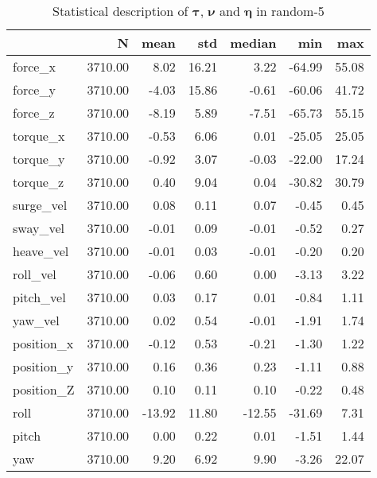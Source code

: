 \begin{table}[hb]
\centering
\caption{Statistical description of $\boldsymbol{\tau}$, $\boldsymbol{\nu}$ and $\boldsymbol{\eta}$ in random-5}
\label{tab:description-random-5}
\begin{tabular}{lrrrrrr}
\toprule
{} &       N &   mean &   std & median &    min &   max \\
\midrule
force\_x    & 3710.00 &   8.02 & 16.21 &   3.22 & -64.99 & 55.08 \\
force\_y    & 3710.00 &  -4.03 & 15.86 &  -0.61 & -60.06 & 41.72 \\
force\_z    & 3710.00 &  -8.19 &  5.89 &  -7.51 & -65.73 & 55.15 \\
torque\_x   & 3710.00 &  -0.53 &  6.06 &   0.01 & -25.05 & 25.05 \\
torque\_y   & 3710.00 &  -0.92 &  3.07 &  -0.03 & -22.00 & 17.24 \\
torque\_z   & 3710.00 &   0.40 &  9.04 &   0.04 & -30.82 & 30.79 \\
surge\_vel  & 3710.00 &   0.08 &  0.11 &   0.07 &  -0.45 &  0.45 \\
sway\_vel   & 3710.00 &  -0.01 &  0.09 &  -0.01 &  -0.52 &  0.27 \\
heave\_vel  & 3710.00 &  -0.01 &  0.03 &  -0.01 &  -0.20 &  0.20 \\
roll\_vel   & 3710.00 &  -0.06 &  0.60 &   0.00 &  -3.13 &  3.22 \\
pitch\_vel  & 3710.00 &   0.03 &  0.17 &   0.01 &  -0.84 &  1.11 \\
yaw\_vel    & 3710.00 &   0.02 &  0.54 &  -0.01 &  -1.91 &  1.74 \\
position\_x & 3710.00 &  -0.12 &  0.53 &  -0.21 &  -1.30 &  1.22 \\
position\_y & 3710.00 &   0.16 &  0.36 &   0.23 &  -1.11 &  0.88 \\
position\_Z & 3710.00 &   0.10 &  0.11 &   0.10 &  -0.22 &  0.48 \\
roll       & 3710.00 & -13.92 & 11.80 & -12.55 & -31.69 &  7.31 \\
pitch      & 3710.00 &   0.00 &  0.22 &   0.01 &  -1.51 &  1.44 \\
yaw        & 3710.00 &   9.20 &  6.92 &   9.90 &  -3.26 & 22.07 \\
\bottomrule
\end{tabular}
\end{table}
